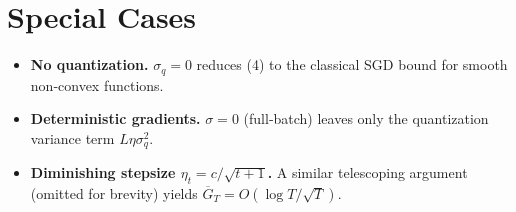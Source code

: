 \documentclass{article}
\begin{document}
\section*{Special Cases}
\begin{itemize}
\item \textbf{No quantization.} $\sigma_q=0$ reduces (4) to the classical SGD bound for smooth non‑convex functions.
\item \textbf{Deterministic gradients.} $\sigma=0$ (full‑batch) leaves only the quantization variance term $L\eta\sigma_q^{2}$.
\item \textbf{Diminishing stepsize $\eta_t=c/\sqrt{t+1}$.} A similar telescoping argument (omitted for brevity) yields $\overline{G}_T = O(\log T / \sqrt{T})$.
\end{itemize}
\end{document}
